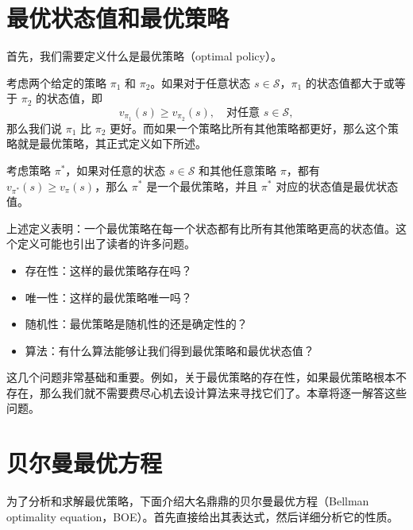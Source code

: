 \section{最优状态值和最优策略}
\label{sec:rl-bellman-opt-optimal}

首先，我们需要定义什么是最优策略（optimal policy）。

考虑两个给定的策略 $\pi_1$ 和 $\pi_2$。如果对于任意状态 $s \in \mathcal{S}$，$\pi_1$ 的状态值都大于或等于 $\pi_2$ 的状态值，即
\begin{equation}
  v_{\pi_1}(s) \geqslant v_{\pi_2}(s), \quad \text{对任意 } s \in \mathcal{S},
\end{equation}
那么我们说 $\pi_1$ 比 $\pi_2$ 更好。而如果一个策略比所有其他策略都更好，那么这个策略就是最优策略，其正式定义如下所述。

\begin{definition}[最优策略与最优状态值]
\label{def:rl-optimal-policy}
考虑策略 $\pi^*$，如果对任意的状态 $s \in \mathcal{S}$ 和其他任意策略 $\pi$，都有 $v_{\pi^*}(s) \geqslant v_\pi(s)$，那么 $\pi^*$ 是一个最优策略，并且 $\pi^*$ 对应的状态值是最优状态值。
\end{definition}

上述定义表明：一个最优策略在每一个状态都有比所有其他策略更高的状态值。这个定义可能也引出了读者的许多问题。
\begin{itemize}
  \item 存在性：这样的最优策略存在吗？
  \item 唯一性：这样的最优策略唯一吗？
  \item 随机性：最优策略是随机性的还是确定性的？
  \item 算法：有什么算法能够让我们得到最优策略和最优状态值？
\end{itemize}

这几个问题非常基础和重要。例如，关于最优策略的存在性，如果最优策略根本不存在，那么我们就不需要费尽心机去设计算法来寻找它们了。本章将逐一解答这些问题。

\section{贝尔曼最优方程}
\label{sec:rl-bellman-opt-boe}

为了分析和求解最优策略，下面介绍大名鼎鼎的贝尔曼最优方程（Bellman optimality equation，BOE）。首先直接给出其表达式，然后详细分析它的性质。

